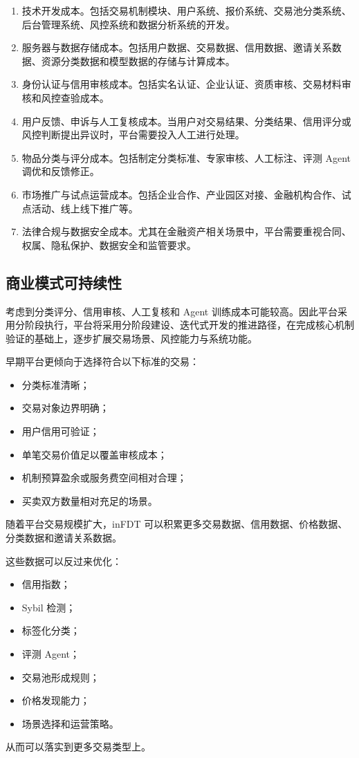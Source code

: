 \documentclass[UTF8,a4paper,12pt]{ctexart}
\begin{document}
\begin{enumerate}
    \item 技术开发成本。包括交易机制模块、用户系统、报价系统、交易池分类系统、后台管理系统、风控系统和数据分析系统的开发。
    \item 服务器与数据存储成本。包括用户数据、交易数据、信用数据、邀请关系数据、资源分类数据和模型数据的存储与计算成本。
    \item 身份认证与信用审核成本。包括实名认证、企业认证、资质审核、交易材料审核和风控查验成本。
    \item 用户反馈、申诉与人工复核成本。当用户对交易结果、分类结果、信用评分或风控判断提出异议时，平台需要投入人工进行处理。
    \item 物品分类与评分成本。包括制定分类标准、专家审核、人工标注、评测 Agent 调优和反馈修正。
    \item 市场推广与试点运营成本。包括企业合作、产业园区对接、金融机构合作、试点活动、线上线下推广等。
    \item 法律合规与数据安全成本。尤其在金融资产相关场景中，平台需要重视合同、权属、隐私保护、数据安全和监管要求。
\end{enumerate}


\subsection{商业模式可持续性}

考虑到分类评分、信用审核、人工复核和 Agent 训练成本可能较高。因此平台采用分阶段执行，平台将采用分阶段建设、迭代式开发的推进路径，在完成核心机制验证的基础上，逐步扩展交易场景、风控能力与系统功能。

早期平台更倾向于选择符合以下标准的交易：

\begin{itemize}
    \item 分类标准清晰；
    \item 交易对象边界明确；
    \item 用户信用可验证；
    \item 单笔交易价值足以覆盖审核成本；
    \item 机制预算盈余或服务费空间相对合理；
    \item 买卖双方数量相对充足的场景。
\end{itemize}


随着平台交易规模扩大，inFDT 可以积累更多交易数据、信用数据、价格数据、分类数据和邀请关系数据。

这些数据可以反过来优化：

\begin{itemize}
    \item 信用指数；
    \item Sybil 检测；
    \item 标签化分类；
    \item 评测 Agent；
    \item 交易池形成规则；
    \item 价格发现能力；
    \item 场景选择和运营策略。
\end{itemize}
从而可以落实到更多交易类型上。
\end{document}
